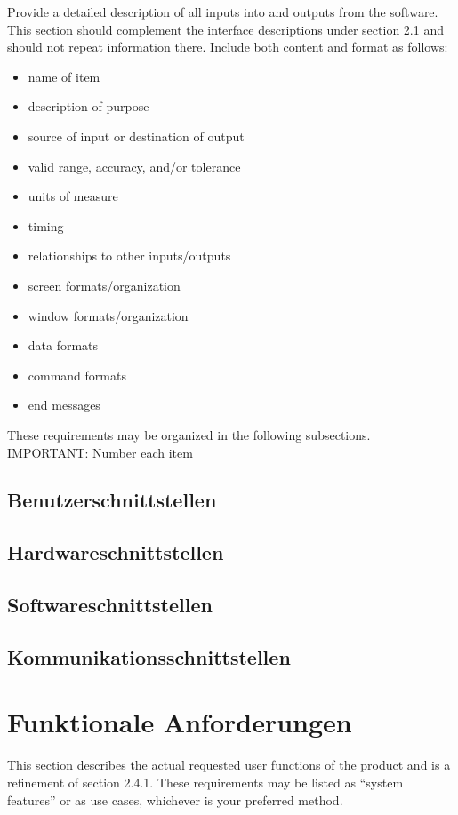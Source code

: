 \noindent Provide a detailed description of all inputs into and outputs from the software. This section should complement the interface descriptions under section 2.1 and should not repeat information there. Include both content and format as follows:
\begin{itemize}
	\item name of item
	\item description of purpose
	\item source of input or destination of output
	\item valid range, accuracy, and/or tolerance
	\item units of measure
	\item timing
	\item relationships to other inputs/outputs
	\item screen formats/organization
	\item window formats/organization
	\item data formats
	\item command formats
	\item end messages
\end{itemize}

\noindent These requirements may be organized in the following subsections. \\[0.1cm]
IMPORTANT: Number each item

\subsection{Benutzerschnittstellen}

\subsection{Hardwareschnittstellen}

\subsection{Softwareschnittstellen}

\subsection{Kommunikationsschnittstellen}

\newpage

\section{Funktionale Anforderungen}
This section describes the actual requested user functions of the product and is a refinement of section 2.4.1. These requirements may be listed as “system features” or as use cases, whichever is your preferred method. \\[-0.3cm]

